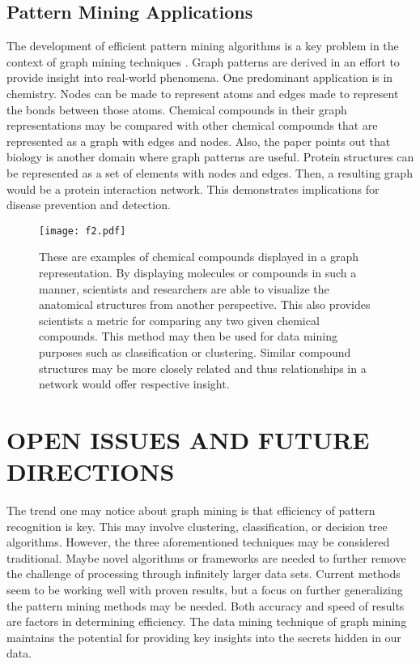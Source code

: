 \documentclass[letterpaper, 10 pt, conference]{ieeeconf}
\begin{document}
\hfill
\subsection{Pattern Mining Applications}
The development of efficient pattern mining algorithms is a key problem in the context of graph mining techniques \cite{c8}. Graph patterns are derived in an effort to provide insight into real-world phenomena. One predominant application is in chemistry. Nodes can be made to represent atoms and edges made to represent the bonds between those atoms. Chemical compounds in their graph representations may be compared with other chemical compounds that are represented as a graph with edges and nodes. Also, the paper points out that biology is another domain where graph patterns are useful. Protein structures can be represented as a set of elements with nodes and edges. Then, a resulting graph would be a protein interaction network. This demonstrates implications for disease prevention and detection.

\begin{figure}[ht!] %
\centering
\texttt{[image: f2.pdf]}
\caption{These are examples of chemical compounds displayed in a graph representation\cite{c8}. By displaying molecules or compounds in such a manner, scientists and researchers are able to visualize the anatomical structures from another perspective. This also provides scientists a metric for comparing any two given chemical compounds. This method may then be used for data mining purposes such as classification or clustering. Similar compound structures may be more closely related and thus relationships in a network would offer respective insight.}
\label{graph_example_2}
\end{figure}

\hfill
\section{OPEN ISSUES AND FUTURE DIRECTIONS}
The trend one may notice about graph mining is that efficiency of pattern recognition is key. This may involve clustering, classification, or decision tree algorithms. However, the three aforementioned techniques may be considered traditional. Maybe novel algorithms or frameworks are needed to further remove the challenge of processing through infinitely larger data sets. Current methods seem to be working well with proven results, but a focus on further generalizing the pattern mining methods may be needed. Both accuracy and speed of results are factors in determining efficiency. The data mining technique of graph mining maintains the potential for providing key insights into the secrets hidden in our data.
\end{document}
